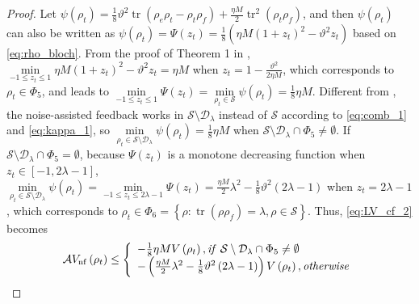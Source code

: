 \documentclass[]{elsarticle}
\begin{document}
\begin{proof}
	Let $\psi\left(\rho_{t}\right)=\frac{1}{8}\vartheta^2\operatorname{tr}\left(\rho_{e}\rho_{t}-\rho_t\rho_{f}\right)+\frac{\eta M}{2}\operatorname{tr}^{2}\left(\rho_t \rho_{f}\right)$, and then $\psi\left(\rho_{t}\right)$ can also be written as $\psi\left(\rho_{t}\right)=\Psi\left(z_t\right)=\frac{1}{8}\left(\eta M\left(1+z_t\right)^2-\vartheta^2z_t\right)$ based on \eqref{eq:rho_bloch}. From the proof of Theorem 1 in \cite{WSJZJ2021}, $\min \limits_{-1\le z_t\le1} \eta M\left(1+z_t\right)^2-\vartheta^2z_t=\eta M$ when $z_t=1-\frac{\vartheta^2}{2\eta M}$, which corresponds to $\rho_t\in \Phi_5$, and leads to $\min \limits_{-1\le z_t\le1} \Psi\left(z_{t}\right)=\min \limits_{\rho_{t}\in \mathcal{S}} \psi\left(\rho_{t}\right)=\frac{1}{8}\eta M$. Different from \cite{WSJZJ2021}, the noise-assisted feedback works in $\mathcal{S}\setminus \mathcal{D}_\lambda$ instead of $\mathcal{S}$ according to \eqref{eq:comb_1} and \eqref{eq:kappa_1}, so $\min \limits_{\rho_{t}\in \mathcal{S}\setminus \mathcal{D}_\lambda} \psi\left(\rho_{t}\right)=\frac{1}{8}\eta M$ when $\mathcal{S}\setminus \mathcal{D}_\lambda\cap\Phi_5\neq\emptyset$. If $\mathcal{S}\setminus \mathcal{D}_\lambda\cap\Phi_5=\emptyset$, because $\Psi\left(z_{t}\right)$ is a monotone decreasing function when $z_t\in\left[-1, 2\lambda-1\right]$, $\min \limits_{\rho_{t}\in \mathcal{S}\setminus \mathcal{D}_\lambda} \psi\left(\rho_{t}\right)=\min \limits_{-1\le z_t\le2\lambda-1} \Psi\left(z_{t}\right)=\frac{{\eta M}}{2}\lambda^{2}-\frac{1}{8}\vartheta^2\left(2\lambda-1\right)$ when $z_t=2\lambda-1$, which corresponds to $\rho_t\in \Phi_6=\left\{\rho:\operatorname{tr}\left(\rho\rho_f\right)=\lambda, \rho\in \mathcal{S}\right\}$. 
	Thus, \eqref{eq:LV_cf_2} becomes 
	\begin{equation*}
		\mathcal{A}V_{\mathrm{nf}}\left(\rho_{t}\right)\le\left\{ \begin{array}{l}-\frac{1}{8}\eta MV\left(\rho_{t}\right), \text{\textit{if}}~\mathcal{S}\setminus \mathcal{D}_\lambda\cap\Phi_5\neq\emptyset\\ -\left(\frac{{\eta M}}{2}\lambda^{2}-\frac{1}{8}\vartheta^2\left(2\lambda-1\right)\right)V\left(\rho_{t}\right), \text{\textit{otherwise}}\end{array} \right. 
	\end{equation*}
	

\end{proof}
\end{document}
